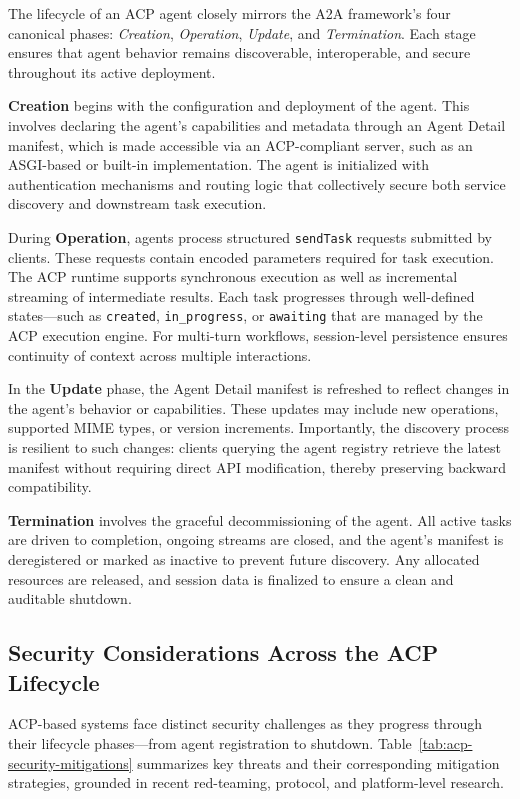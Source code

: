 \documentclass{article}
\begin{document}
The lifecycle of an ACP agent closely mirrors the A2A framework’s four canonical phases: \textit{Creation}, \textit{Operation}, \textit{Update}, and \textit{Termination}. Each stage ensures that agent behavior remains discoverable, interoperable, and secure throughout its active deployment.

\textbf{Creation} begins with the configuration and deployment of the agent. This involves declaring the agent’s capabilities and metadata through an Agent Detail manifest, which is made accessible via an ACP-compliant server, such as an ASGI-based or built-in implementation. The agent is initialized with authentication mechanisms and routing logic that collectively secure both service discovery and downstream task execution.

During \textbf{Operation}, agents process structured \texttt{sendTask} requests submitted by clients. These requests contain encoded parameters required for task execution. The ACP runtime supports synchronous execution as well as incremental streaming of intermediate results. Each task progresses through well-defined states—such as \texttt{created}, \texttt{in\_progress}, or \texttt{awaiting} that are managed by the ACP execution engine. For multi-turn workflows, session-level persistence ensures continuity of context across multiple interactions.

In the \textbf{Update} phase, the Agent Detail manifest is refreshed to reflect changes in the agent’s behavior or capabilities. These updates may include new operations, supported MIME types, or version increments. Importantly, the discovery process is resilient to such changes: clients querying the agent registry retrieve the latest manifest without requiring direct API modification, thereby preserving backward compatibility.

\textbf{Termination} involves the graceful decommissioning of the agent. All active tasks are driven to completion, ongoing streams are closed, and the agent’s manifest is deregistered or marked as inactive to prevent future discovery. Any allocated resources are released, and session data is finalized to ensure a clean and auditable shutdown.




\subsection{Security Considerations Across the ACP Lifecycle}

ACP-based systems face distinct security challenges as they progress through their lifecycle phases—from agent registration to shutdown. Table~\ref{tab:acp-security-mitigations} summarizes key threats and their corresponding mitigation strategies, grounded in recent red-teaming, protocol, and platform-level research.
\end{document}
